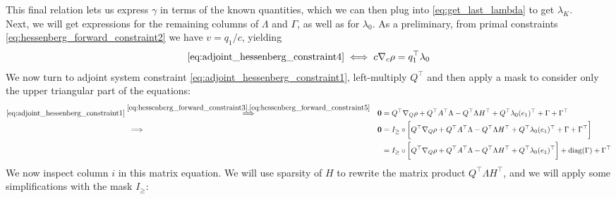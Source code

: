\documentclass[a4paper,12pt]{article}
\theoremstyle{definition}
\begin{document}
This final relation lets us express $\gamma$ in terms of the known quantities, which we can then plug into \eqref{eq:get_last_lambda} to get $\lambda_K$.
\\
Next, we will get expressions for the remaining columns of $\Lambda$ and $\Gamma$, as well as for $\lambda_0$. As a preliminary, from primal constraints \eqref{eq:hessenberg_forward_constraint2} we have $v = q_1/c$, yielding 
\begin{align}
    \eqref{eq:adjoint_hessenberg_constraint4} \iff c\nabla_{c} \rho = q_1^\top \lambda_0 \label{eq:get_q1_top_lambda}
\end{align}
We now turn to adjoint system constraint \eqref{eq:adjoint_hessenberg_constraint1}, left-multiply $Q^\top$ and then apply a mask to consider only the upper triangular part of the equations:
\begin{align*}
    \eqref{eq:adjoint_hessenberg_constraint1} &\overset{\eqref{eq:hessenberg_forward_constraint3}, \eqref{eq:hessenberg_forward_constraint5}}{\implies} \empty & \mathbf{0} &= Q^\top \nabla_{Q} \rho + Q^\top A^\top \Lambda - Q^\top \Lambda H^\top + Q^\top \lambda_0 (e_{1})^\top + \Gamma + \Gamma^\top
    \\
    \empty &\;\implies\; \empty & \mathbf{0} &= I_\geq \circ \bigg[Q^\top \nabla_{Q} \rho + Q^\top A^\top \Lambda - Q^\top \Lambda H^\top + Q^\top \lambda_0 (e_{1})^\top + \Gamma + \Gamma^\top\bigg]
    \\
    \empty & \empty & &= I_\geq \circ \bigg[Q^\top \nabla_{Q} \rho + Q^\top A^\top \Lambda - Q^\top \Lambda H^\top + Q^\top \lambda_0 (e_{1})^\top\bigg] + \text{diag}(\Gamma) + \Gamma^\top
\end{align*}
We now inspect column $i$ in this matrix equation. We will use sparsity of $H$ to rewrite the matrix product $Q^\top \Lambda H^\top$, and we will apply some simplifications with the mask $I_\geq$:
\end{document}
